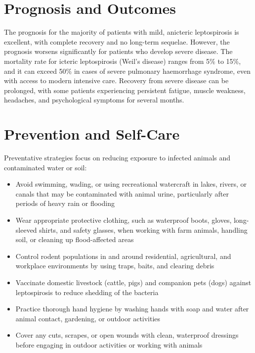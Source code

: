 \section*{Prognosis and Outcomes}
The prognosis for the majority of patients with mild, anicteric leptospirosis is excellent, with complete recovery and no long-term sequelae. However, the prognosis worsens significantly for patients who develop severe disease. The mortality rate for icteric leptospirosis (Weil's disease) ranges from 5\% to 15\%, and it can exceed 50\% in cases of severe pulmonary haemorrhage syndrome, even with access to modern intensive care. Recovery from severe disease can be prolonged, with some patients experiencing persistent fatigue, muscle weakness, headaches, and psychological symptoms for several months.

\section*{Prevention and Self-Care}
Preventative strategies focus on reducing exposure to infected animals and contaminated water or soil:
\begin{itemize}
    \item Avoid swimming, wading, or using recreational watercraft in lakes, rivers, or canals that may be contaminated with animal urine, particularly after periods of heavy rain or flooding
    \item Wear appropriate protective clothing, such as waterproof boots, gloves, long-sleeved shirts, and safety glasses, when working with farm animals, handling soil, or cleaning up flood-affected areas
    \item Control rodent populations in and around residential, agricultural, and workplace environments by using traps, baits, and clearing debris
    \item Vaccinate domestic livestock (cattle, pigs) and companion pets (dogs) against leptospirosis to reduce shedding of the bacteria
    \item Practice thorough hand hygiene by washing hands with soap and water after animal contact, gardening, or outdoor activities
    \item Cover any cuts, scrapes, or open wounds with clean, waterproof dressings before engaging in outdoor activities or working with animals
\end{itemize}


